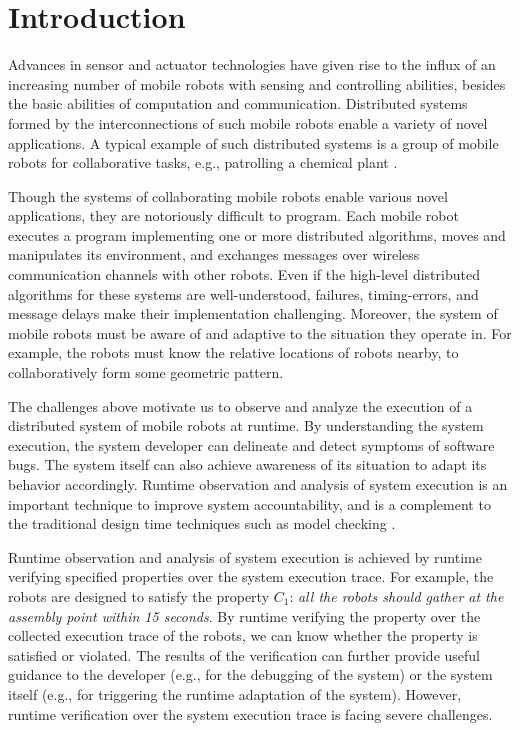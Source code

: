\documentclass[10pt,conference,compsocconf,letterpaper]{IEEEtran}
\begin{document}
\IEEEpeerreviewmaketitle

\section{Introduction} \label{sec:Introduction}

Advances in sensor and actuator technologies have given rise to the influx of an increasing number of mobile robots with sensing and controlling abilities, besides the basic abilities of computation and communication. Distributed systems formed by the interconnections of such mobile robots enable a variety of novel applications. A typical example of such distributed systems is a group of mobile robots for collaborative tasks, e.g., patrolling a chemical plant \cite{Zhan13, Duggirala12, Yang15}.

Though the systems of collaborating mobile robots enable various novel applications, they are notoriously difficult to program. Each mobile robot executes a program implementing one or more distributed algorithms, moves and manipulates its environment, and exchanges messages over wireless communication channels with other robots. Even if the high-level distributed algorithms for these systems are well-understood, failures, timing-errors, and message delays make their implementation challenging. Moreover, the system of mobile robots must be aware of and adaptive to the situation they operate in. For example, the robots must know the relative locations of robots nearby, to collaboratively form some geometric pattern.

The challenges above motivate us to observe and analyze the execution of a distributed system of mobile robots at runtime. By understanding the system execution, the system developer can delineate and detect symptoms of software bugs. The system itself can also achieve awareness of its situation to adapt its behavior accordingly. Runtime observation and analysis of system execution is an important technique to improve system accountability, and is a complement to the traditional design time techniques such as model checking \cite{Baier08}.

Runtime observation and analysis of system execution is achieved by runtime verifying specified properties over the system execution trace. For example, the robots are designed to satisfy the property $C_1$: \textit{all the robots should gather at the assembly point within 15 seconds}. By runtime verifying the property over the collected execution trace of the robots, we can know whether the property is satisfied or violated. The results of the verification can further provide useful guidance to the developer (e.g., for the debugging of the system) or the system itself (e.g., for triggering the runtime adaptation of the system). However, runtime verification over the system execution trace is facing severe challenges.
\end{document}

